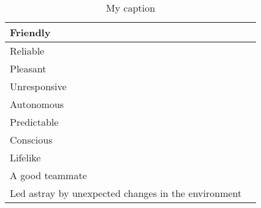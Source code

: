 \begin{table}[]
\begin{tabular}{p{5cm}|l}
		Friendly & \\ \hline
		Reliable & \\ \hline
		Pleasant & \\ \hline
		Unresponsive & \\ \hline
		Autonomous & \\ \hline
		Predictable & \\ \hline
		Conscious & \\ \hline
		Lifelike & \\ \hline
		A good teammate & \\ \hline
		Led astray by unexpected changes in the environment & \\
	\end{tabular}
	\caption{My caption}
	\label{my-label}
\end{table}